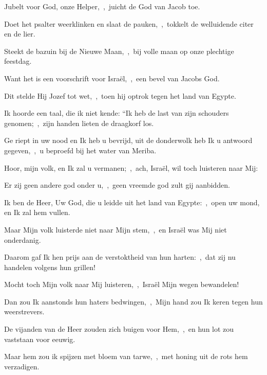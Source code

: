 \documentclass[12pt,twoside,a5paper]{article}
\begin{document}

\begin{halfparskip}

  Jubelt voor God, onze Helper,~\sep\ juicht de God van Jacob toe.

  Doet het psalter weerklinken en slaat de pauken,~\sep\ tokkelt de welluidende citer en de lier.

  Steekt de bazuin bij de Nieuwe Maan,~\sep\ bij volle maan op onze plechtige feestdag.

  Want het is een voorschrift voor Israël,~\sep\ een bevel van Jacobs God.

  Dit stelde Hij Jozef tot wet,~\sep\ toen hij optrok tegen het land van Egypte.
\end{halfparskip}

\begin{halfparskip}

  Ik hoorde een taal, die ik niet kende: ``Ik heb de last van zijn schouders genomen;~\sep\ zijn handen lieten de draagkorf los.

  Ge riept in uw nood en Ik heb u bevrijd, uit de donderwolk heb Ik u antwoord gegeven,~\sep\ u beproefd bij het water van Meriba.

  Hoor, mijn volk, en Ik zal u vermanen;~\sep\ ach, Israël, wil toch luisteren naar Mij:

  Er zij geen andere god onder u,~\sep\ geen vreemde god zult gij aanbidden.

  Ik ben de Heer, Uw God, die u leidde uit het land van Egypte:~\sep\ open uw mond, en Ik zal hem vullen.

  Maar Mijn volk luisterde niet naar Mijn stem,~\sep\ en Israël was Mij niet onderdanig.

  Daarom gaf Ik hen prijs aan de verstoktheid van hun harten:~\sep\ dat zij nu handelen volgens hun grillen!

  Mocht toch Mijn volk naar Mij luisteren,~\sep\ Israël Mijn wegen bewandelen!

  Dan zou Ik aanstonds hun haters bedwingen,~\sep\ Mijn hand zou Ik keren tegen hun weerstrevers.

  De vijanden van de Heer zouden zich buigen voor Hem,~\sep\ en hun lot zou vaststaan voor eeuwig.

  Maar hem zou ik spijzen met bloem van tarwe,~\sep\ met honing uit de rots hem verzadigen.
\end{halfparskip}
\end{document}
